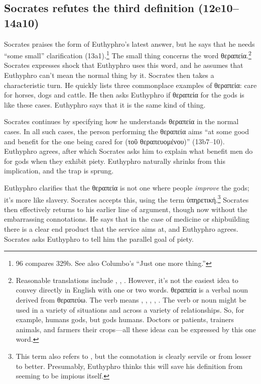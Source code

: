 \documentclass[11pt]{article}
\begin{document}

\subsection{Socrates refutes the third definition (12e10--14a10)}

Socrates praises the form of Euthyphro's latest answer, but he says that he
needs ``some small'' clarification (13a1).\footnote{\citet{bailly2003} 96
compares  329b.  See also Columbo's ``Just one more
thing.''} The small thing concerns the word {\g θεραπεία}.\footnote{
Reasonable translations include , ,
.  However, it's not the easiest idea to convey directly
in English with one or two words.  {\g θεραπεία} is a verbal noun derived
from {\g θεραπεύω}.  The verb means , ,
, , .  The verb or
noun might be used in a variety of situations and across a variety of
relationships.  So, for example, humans  gods, but gods
 humans.  Doctors  or 
patients, trainers  animals, and farmers  their
crops---all these ideas can be expressed by this one word.}  Socrates
expresses shock that Euthyphro uses this word, and he assumes that Euthyphro
can't mean the normal thing by it.  Socrates then takes a characteristic
turn.  He quickly lists three commonplace examples of {\g θεραπεία}: care
for horses, dogs and cattle.  He then asks Euthyphro if θεραπεία for the
gods is like these cases.  Euthyphro says that it is the same kind of
thing.

Socrates continues by specifying how he understands {\g θεραπεία} in the
normal cases.  In all such cases, the person performing the {\g θεραπεία}
aims ``at some good and benefit for the one being cared for ({\g τοῦ
θεραπευομένου})'' (13b7--10).  Euthyphro agrees, after which Socrates asks
him to explain what benefit men do for gods when they exhibit piety.
Euthyphro naturally shrinks from this implication, and the trap is sprung.

Euthyphro clarifies that the {\g θεραπεία} is not one where people
\emph{improve} the gods; it's more like slavery.  Socrates accepts this,
using the term {\g ὑπηρετική}.\footnote{This term also refers to
, but the connotation is clearly servile or from lesser
to better.  Presumably, Euthyphro thinks this will save his definition from
seeming to be impious itself.}  Socrates then effectively returns to his
earlier line of argument, though now without the embarrassing connotations.
He says that in the case of medicine or shipbuilding there is a clear end
product that the service aims at, and Euthyphro agrees.  Socrates asks
Euthyphro to tell him the parallel goal of piety.
\end{document}
